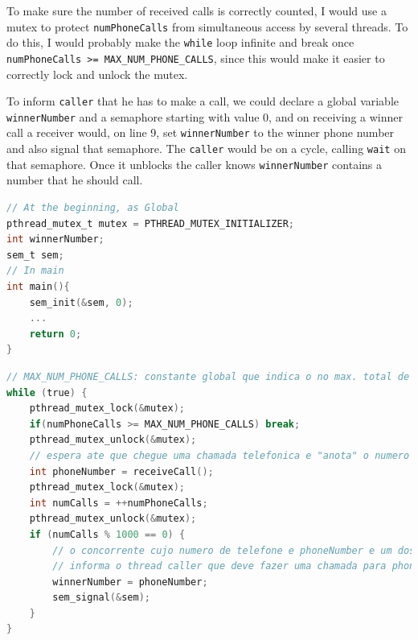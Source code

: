 \documentclass{sope}
\begin{document}
{
To make sure the number of received calls is correctly counted, I would use a mutex to protect \texttt{numPhoneCalls} from simultaneous access by several threads. To do this, I would probably make the \texttt{while} loop infinite and break once \texttt{numPhoneCalls >= MAX\_NUM\_PHONE\_CALLS}, since this would make it easier to correctly lock and unlock the mutex.

To inform \texttt{caller} that he has to make a call, we could declare a global variable \texttt{winnerNumber} and a semaphore starting with value 0, and on receiving a winner call a receiver would, on line 9, set \texttt{winnerNumber} to the winner phone number and also signal that semaphore. The \texttt{caller} would be on a cycle, calling \texttt{wait} on that semaphore. Once it unblocks the caller knows \texttt{winnerNumber} contains a number that he should call.

\begin{lstlisting}[language=C,basicstyle=\ttfamily\small]
// At the beginning, as Global
pthread_mutex_t mutex = PTHREAD_MUTEX_INITIALIZER;
int winnerNumber;
sem_t sem;
// In main
int main(){
    sem_init(&sem, 0);
    ...
    return 0;
}
\end{lstlisting}

\begin{lstlisting}[language=C,basicstyle=\ttfamily\small]
// MAX_NUM_PHONE_CALLS: constante global que indica o no max. total de chamadas
while (true) {
    pthread_mutex_lock(&mutex);
    if(numPhoneCalls >= MAX_NUM_PHONE_CALLS) break;
    pthread_mutex_unlock(&mutex);
    // espera ate que chegue uma chamada telefonica e "anota" o numero de telefone
    int phoneNumber = receiveCall();
    pthread_mutex_lock(&mutex);
    int numCalls = ++numPhoneCalls;
    pthread_mutex_unlock(&mutex);
    if (numCalls % 1000 == 0) {
        // o concorrente cujo numero de telefone e phoneNumber e um dos vencedores
        // informa o thread caller que deve fazer uma chamada para phoneNumber
        winnerNumber = phoneNumber;
        sem_signal(&sem);
    }
}
\end{lstlisting}
        
}
\end{document}
